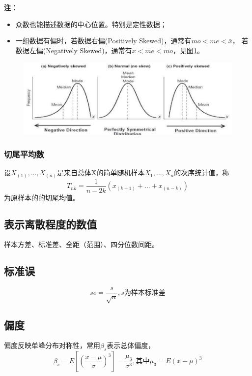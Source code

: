 \documentclass[lang=cn,10pt]{elegantbook}
\begin{document}
\textbf{注：}
\begin{itemize}
    \item 众数也能描述数据的中心位置。特别是定性数据；
    \item 一组数据有偏时，若数据右偏(Positively Skewed)，通常有$mo < me < \bar{x}$，
          若数据左偏(Negatively Skewed)，通常有$\bar{x} < me < mo$，见图\ref{im2_1}。
\end{itemize}

\begin{figure}
    \centering
    \includegraphics[scale = 0.6]{img/2_1.png}
    \caption{}
    \label{im2_1}
\end{figure}

\subsubsection{切尾平均数}
设$X_{(1)},...,X_{(n)}\text{是来自总体X的简单随机样本}X_{1},...,X_{n}$的次序统计值，称
\begin{equation}
    T_{nk}=\frac{1}{n-2k}(x_{(k+1)}+\ldots+x_{(n-k)})
\end{equation}
为原样本的的切尾均值。

\subsection{表示离散程度的数值}
样本方差、标准差、全距（范围）、四分位数间距。

\subsection{标准误}
\begin{equation}
    se = \frac{s}{\sqrt{n}},s\text{为样本标准差}
\end{equation}

\subsection{偏度}
偏度反映单峰分布对称性，常用$\beta_s$表示总体偏度，
\begin{equation}
    \beta_s=E[(\frac{x-\mu}\sigma)^3]=\frac{\mu_3}{\sigma^3},\text{其中}\mu_3=E(x-\mu)^3
\end{equation}
\end{document}
